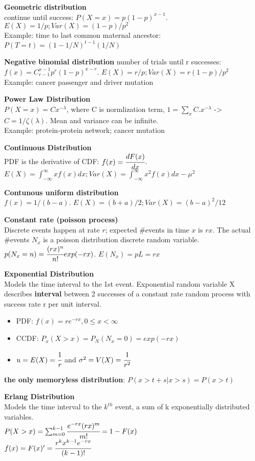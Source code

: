 \documentclass[a4paper,10pt]{article}
\begin{document}
\begin{multicols}{2}
\textbf{Geometric distribution}\\
continue until success: $P(X=x)=p(1-p)^{x-1}$.
$E(X)=1/p;Var(X)=(1-p)/p^2$\\
Example: time to last common maternal ancestor: $P(T=t)=(1-1/N)^{t-1}(1/N)$

\textbf{Negative binomial distribution}
number of trials until r successes: $f(x)=C_{r-1}^{x-1}p^r(1-p)^{x-r}$. $E(X)=r/p;Var(X)=r(1-p)/p^2$\\
Example: cancer passenger and driver mutation

\textbf{Power Law Distribution}\\
$P(X=x)=Cx^{-\lambda}$, where C is normlization term, $1=\sum_xC.x^{-\lambda}$ -> $C=1/\zeta(\lambda)$. Mean and variance can be infinite. \\
Example: protein-protein network; cancer mutation

\textbf{Continuous Distribution}\\
PDF is the derivative of CDF: $f(x)=\cfrac{dF(x)}{dx}$.
$E(X)=\int_{-\infty}^\infty xf(x)dx;Var(X)=\int_{-\infty}^\infty x^2f(x)dx-\mu^2$

\textbf{Contunous uniform distribution}\\
$f(x)=1/(b-a)$. $E(X)=(b+a)/2;Var(X)=(b-a)^2/12$

\textbf{Constant rate (poisson process)}\\
Discrete events happen at rate $r$; expected \#events in time $x$ is $rx$. The actual \#events $N_x$ is a poisson distribution discrete random variable. $p(N_x=n)=\cfrac{(rx)^n}{n!}exp(-rx)$. $E(N_x)=pL=rx$

\textbf{Exponential Distribution}\\
Models the time interval to the 1st event. Exponential random variable X describes \textbf{interval} between 2 successes of a constant rate random process with success rate r per unit interval.
\begin{itemize}
    \item PDF: $f(x)=re^{-rx}, 0\le x<\infty$
    \item CCDF: $P_x(X>x)=P_N(N_x=0)=exp(-rx)$
    \item $u=E(X)=\cfrac{1}{r}$ and $\sigma^2=V(X)=\cfrac{1}{r^2}$
\end{itemize}
\textbf{the only memoryless distribution}: $P(x>t+s|x>s)=P(x>t)$

\textbf{Erlang Distribution}\\
Models the time interval to the $k^{th}$ event, a sum of k exponentially distributed variables.\\
$P(X>x)=\sum_{m=0}^{k-1}\cfrac{e^{-rx}(rx)^m}{m!}=1-F(x)$\\
$f(x)=F(x)'=\cfrac{r^kx^{k-1}e^{-rx}}{(k-1)!}$


\end{multicols}
\end{document}
